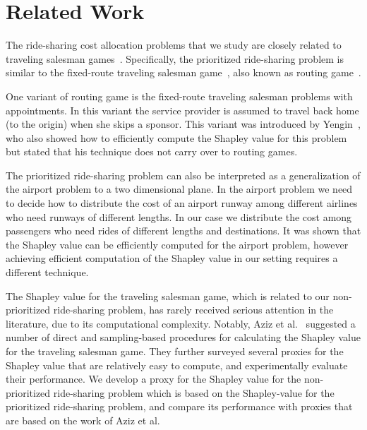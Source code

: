 \documentclass[sigconf]{aamas}
\begin{document}
\section{Related Work}
The ride-sharing cost allocation problems that we study are closely related to traveling salesman games~\cite{potters1992traveling}. 
Specifically, the prioritized ride-sharing problem is similar to the fixed-route traveling salesman game~\cite{fishburn1983fixed,potters1992traveling,besozzi2014traveling}, also known as routing game~\cite{yengin2012characterizing}.

One variant of routing game is the fixed-route traveling salesman problems with appointments. In this variant the service provider is assumed to travel back home (to the origin) when she skips a sponsor. This variant was introduced by Yengin~\cite{yengin2012characterizing}, who also showed how to efficiently compute the Shapley value for this problem but stated that his technique does not carry over to routing games.

The prioritized ride-sharing problem can also be interpreted as a generalization of the airport problem \cite{littlechild1973simple} to a two dimensional plane.
In the airport problem we need to decide how to distribute the cost of an airport runway among different airlines who need runways of different lengths.
In our case we distribute the cost among passengers who need rides of different lengths and destinations.
It was shown that the Shapley value can be efficiently computed for the airport problem, however achieving efficient computation of the Shapley value in our setting requires a different technique.

The Shapley value for the traveling salesman game, which is related to our non-prioritized ride-sharing problem, has rarely received serious attention in the literature, due to its computational complexity. Notably, Aziz et al.~\cite{aziz2016study} suggested a number of direct and sampling-based procedures for calculating the Shapley value for the traveling salesman game. They further surveyed several proxies for the Shapley value that are relatively easy to compute, and experimentally evaluate their performance. We develop a proxy for the Shapley value for the non-prioritized ride-sharing problem which is based on the Shapley-value for the prioritized ride-sharing problem, and compare its performance with proxies that are based on the work of Aziz et al.
\end{document}
